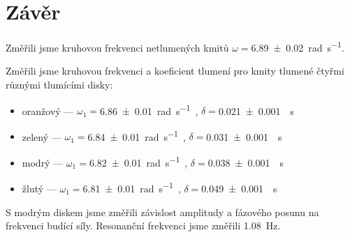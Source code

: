 \section*{Závěr}
Změřili jsme kruhovou frekvenci netlumených kmitů $\omega = $\SI{6.89(2)}{\radian\per\s}.

Změřili jsme kruhovou frekvenci a koeficient tlumení pro kmity tlumené čtyřmi různými tlumícími disky:
\begin{itemize}
\item oranžový --- $\omega_1 = $\SI{6.86(1)}{\radian\per\s}~, $\delta = $\SI{0.021(1)}{\per\s}
\item zelený --- $\omega_1 = $\SI{6.84(1)}{\radian\per\s}~, $\delta = $\SI{0.031(1)}{\per\s}
\item modrý --- $\omega_1 = $\SI{6.82(1)}{\radian\per\s}~, $\delta = $\SI{0.038(1)}{\per\s}
\item žlutý --- $\omega_1 = $\SI{6.81(1)}{\radian\per\s}~, $\delta = $\SI{0.049(1)}{\per\s}
\end{itemize}

S modrým diskem jsme změřili závislost amplitudy a fázového posunu na frekvenci budící síly.
Resonanční frekvenci jsme změřili \SI{1.08}{\hertz}.
